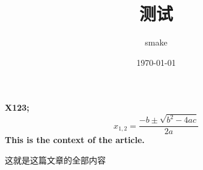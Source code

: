 \documentclass[UTF8]{ctexart}
\title{测试}
\author{smake}
\date{\today}
\begin{document}
    \maketitle
    
    \bf{X123};
    \[
        x_{1,2} = \frac{-b \pm \sqrt{b^2 - 4ac}}{2a}
    \]
    This is the context of the article.

    这就是这篇文章的全部内容

    
\end{document}
